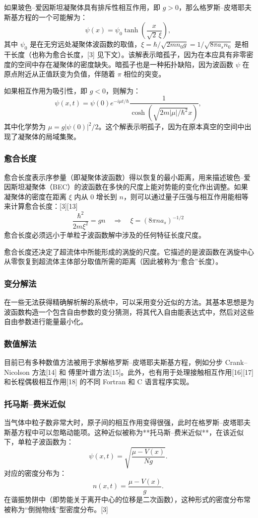 如果玻色–爱因斯坦凝聚体具有排斥性相互作用，即 $g > 0$，那么格罗斯–皮塔耶夫斯基方程的一个可能解为：
$$
\psi(x) = \psi_0 \tanh\left( \frac{x}{\sqrt{2} \, \xi} \right),~
$$
其中 $\psi_0$ 是在无穷远处凝聚体波函数的取值，$\xi = \hbar/\sqrt{2 m n_0 g} = 1/\sqrt{8\pi a_s n_0}$ 是相干长度（也称为愈合长度，[3] 见下文）。该解表示暗孤子，因为在本应具有非零密度的空间中存在凝聚体的密度缺失。暗孤子也是一种拓扑缺陷，因为波函数 $\psi$ 在原点附近从正值跃变为负值，伴随着 $\pi$ 相位的突变。

如果相互作用为吸引性，即 $g < 0$，则解为：
$$
\psi(x, t) = \psi(0) e^{-i\mu t / \hbar} \frac{1}{\cosh\left( \sqrt{2m|\mu|/\hbar^2} x \right)},~
$$
其中化学势为 $\mu = g |\psi(0)|^2/2$。这个解表示明孤子，因为在原本真空的空间中出现了凝聚体的局域集聚。
\subsubsection{愈合长度}
愈合长度表示序参量（即凝聚体波函数）得以恢复的最小距离，用来描述玻色–爱因斯坦凝聚体（BEC）的波函数在多快的尺度上能对势能的变化作出调整。如果凝聚体的密度在距离 $\xi$ 内从 0 增长到 $n$，则可以通过量子压强与相互作用能相等来计算愈合长度：[3][13]
$$
\frac{\hbar^2}{2m \xi^2} = gn \quad \Longrightarrow \quad \xi = \left(8\pi n a_s\right)^{-1/2}~
$$
愈合长度必须远小于单粒子波函数解中涉及的任何特征长度尺度。

愈合长度还决定了超流体中所能形成的涡旋的尺度。它描述的是波函数在涡旋中心从零恢复到超流体主体部分取值所需的距离（因此被称为“愈合”长度）。
\subsubsection{变分解法}
在一些无法获得精确解析解的系统中，可以采用变分近似的方法。其基本思想是为波函数构造一个包含自由参数的变分猜测，将其代入自由能表达式中，然后对这些自由参数进行能量最小化。
\subsubsection{数值解法}
目前已有多种数值方法被用于求解格罗斯–皮塔耶夫斯基方程，例如分步 Crank–Nicolson 方法[14] 和 傅里叶谱方法[15]。此外，也有用于处理接触相互作用[16][17] 和长程偶极相互作用[18] 的不同 Fortran 和 C 语言程序实现。
\subsubsection{托马斯–费米近似}
当气体中粒子数非常大时，原子间的相互作用变得很强，此时在格罗斯–皮塔耶夫斯基方程中可以忽略动能项。这种近似被称为**托马斯–费米近似**，在该近似下，单粒子波函数为：
$$
\psi(x, t) = \sqrt{ \frac{ \mu - V(x) }{ N g } }.~
$$
对应的密度分布为：
$$
n(x, t) = \frac{ \mu - V(x) }{ g }.~
$$
在谐振势阱中（即势能关于离开中心的位移是二次函数），这种形式的密度分布常被称为“倒抛物线”型密度分布。[3]
